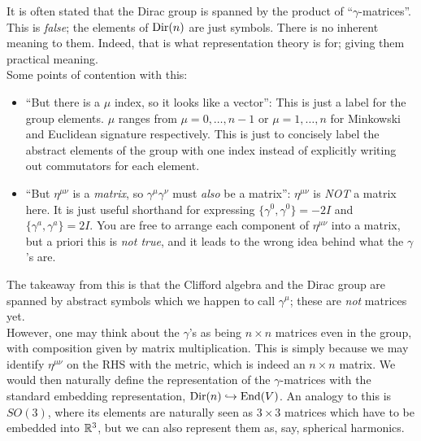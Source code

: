 \documentclass[11pt]{article}
\begin{document}
\begin{reemark}
    It is often stated that the Dirac group is spanned by the product of
    ``$\gamma$-matrices''. This is \emph{false}; the elements of ${\rm Dir}(n)$
    are just symbols. There is no inherent meaning to them. Indeed, that 
    is what representation theory is for; giving them practical meaning.\\

    \noin
    Some points of contention with this:
    \begin{itemize}
        \item ``But there is a $\mu$ index, so it looks like a vector'':
        This is just a label for the group elements. $\mu$ ranges from
        $\mu = 0, \ldots, n - 1$ or $\mu = 1, \ldots, n$ for Minkowski and
        Euclidean signature respectively. This is just to concisely label the
        abstract elements of the group with one index instead of explicitly
        writing out commutators for each element.
        \item ``But $\eta^{\mu \nu}$ is a \emph{matrix}, so $\gamma^\mu \gamma^\nu$
        must \emph{also} be a matrix'': $\eta^{\mu \nu}$ is \emph{NOT} a matrix
        here. It is just useful shorthand for expressing $\{ \gamma^0, \gamma^0 \} = - 2I$
        and $\{ \gamma^a, \gamma^a \} = 2 I$. You are free to arrange each component
        of $\eta^{\mu \nu}$ into a matrix, but a priori this is \emph{not true}, and it leads
        to the wrong idea behind what the $\gamma$'s are.
    \end{itemize}
    The takeaway from this is that the Clifford algebra and the Dirac group are
    spanned by abstract symbols which we happen to call $\gamma^\mu$; these are
    \emph{not} matrices yet.\\

    \noin
    However, one may think about the $\gamma$'s as being $n \times n$
    matrices even in the group, with composition given by matrix multiplication.
    This is simply because we may identify $\eta^{\mu \nu}$ on the RHS
    with the metric, which is indeed an $n \times n$ matrix. We would
    then naturally define the representation of the $\gamma$-matrices
    with the standard embedding representation, $\operatorname{Dir}(n) \hookrightarrow \operatorname{End}(V)$.
    An analogy to this is $SO(3)$, where its elements are naturally
    seen as $3 \times 3$ matrices which have to be embedded into $\mathbb{R}^3$,
    but we can also represent them as, say, spherical harmonics.
\end{reemark}
\end{document}

